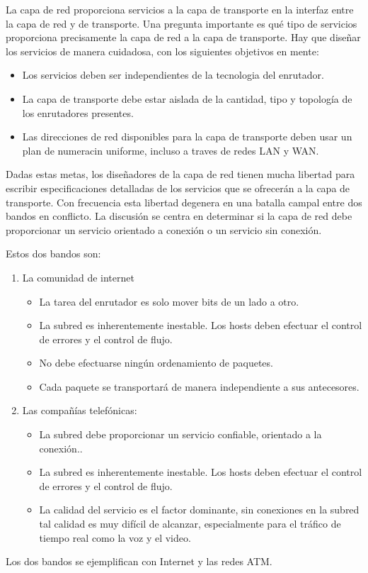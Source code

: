 \documentclass[10pt,a4paper]{report}
\begin{document}
La capa de red proporciona servicios a la capa de transporte en la interfaz entre la 
capa de red y de transporte. Una pregunta importante es qué tipo de servicios 
proporciona precisamente la capa de red a la capa de transporte. Hay que diseñar los 
servicios de manera cuidadosa, con los siguientes objetivos en mente:
	\begin{itemize}
		\item Los servicios deben ser independientes de la tecnologia del 			
		enrutador.
		\item La capa de transporte debe estar aislada de la cantidad, tipo y topología 
		de los enrutadores presentes.
		\item Las direcciones de red disponibles para la capa de transporte deben usar 
		un plan de numeracin uniforme, incluso a traves de redes LAN y WAN.
	\end{itemize}
\par Dadas estas metas, los diseñadores de la capa de red tienen mucha libertad para 
escribir especificaciones detalladas de los servicios que se ofrecerán a la capa de 
transporte. Con frecuencia esta libertad degenera en una batalla campal entre dos 
bandos en conflicto. La discusión se centra en determinar si la capa de red debe 
proporcionar un servicio orientado a conexión o un servicio sin conexión.
\par Estos dos bandos son:
	\begin{enumerate}
		\item La comunidad de internet
		\begin{itemize}\itemsep=0pt
			\item La tarea del enrutador es solo mover bits de un lado a otro.
			\item La subred es inherentemente inestable. Los hosts deben efectuar el 
			control de errores y el control de flujo.
			\item No debe efectuarse ningún ordenamiento de paquetes.
			\item Cada paquete se transportará de manera independiente a sus 
			antecesores.
			\end{itemize}
		\item Las compañías telefónicas:
		\begin{itemize}\itemsep=0pt
			\item La subred debe proporcionar un servicio confiable, orientado a la
conexión..
			\item La subred es inherentemente inestable. Los hosts deben efectuar el 
			control de errores y el control de flujo.
			\item La calidad del servicio es el factor dominante, sin conexiones en la 
			subred tal calidad es muy difícil de alcanzar, especialmente para el tráfico de 
			tiempo real como la voz y el video.
		\end{itemize}
	\end{enumerate}
\par Los dos bandos se ejemplifican con Internet y las redes ATM.
\end{document}
